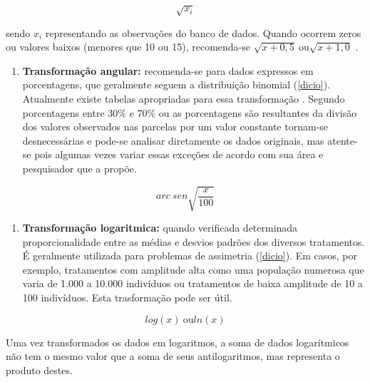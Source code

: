 \documentclass[
]{book}
\providecommand{\tightlist}{%
  \setlength{\itemsep}{0pt}\setlength{\parskip}{0pt}}
\begin{document}
\begin{equation}
\sqrt{x_i}
\label{eq:transraiz}
\end{equation}

sendo \(x_i\) representando as observações do banco de dados. Quando ocorrem zeros ou valores baixos (menores que 10 ou 15), recomenda-se \(\sqrt{x+0,5} \ \mbox{ou} \sqrt{x+1,0}\) \citep{banzatto1992experimentaccao}.

\begin{enumerate}
\def\labelenumi{\arabic{enumi}.}
\setcounter{enumi}{2}
\tightlist
\item
  \textbf{Transformação angular:} recomenda-se para dados expressos em porcentagens, que geralmente seguem a distribuição binomial (\ref{dicio}). Atualmente existe tabelas apropriadas para essa transformação \citep{banzatto1992experimentaccao}. Segundo \citet{banzatto1992experimentaccao} porcentagens entre 30\% e 70\% ou as porcentagens são resultantes da divisão dos valores observados nas parcelas por um valor constante tornam-se desnecessárias e pode-se analisar diretamente os dados originais, mas atente-se pois algumas vezes variar essas exceções de acordo com sua área e pesquisador que a propõe.
\end{enumerate}

\begin{equation}
arc \ sen \sqrt{\frac{x}{100}}
\label{eq:transang}
\end{equation}

\begin{enumerate}
\def\labelenumi{\arabic{enumi}.}
\setcounter{enumi}{3}
\tightlist
\item
  \textbf{Transformação logaritmica:} quando verificada determinada proporcionalidade entre as médias e desvios padrões dos diversos tratamentos. É geralmente utilizada para problemas de assimetria (\ref{dicio}). Em casos, por exemplo, tratamentos com amplitude alta como uma população numerosa que varia de 1.000 a 10.000 indivíduos ou tratamentos de baixa amplitude de 10 a 100 indivíduos. Esta trasformação pode ser útil.
\end{enumerate}

\begin{equation}
log(x) \ \mbox{ou} ln(x)
\label{eq:translog}
\end{equation}

Uma vez transformados os dados em logaritmos, a soma de dados logarítmicos não tem o mesmo valor que a soma de seus antilogaritmos, mas representa o produto destes.
\end{document}
